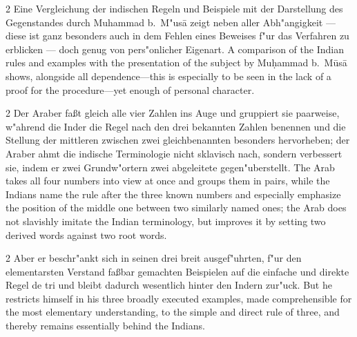\documentclass[10pt,a4paper]{article}
\renewcommand{\switchcolumn}{\syncronize\nointerlineskip\columnbreak}
\begin{document}
\begin{paracol}{2}
Eine Vergleichung der indischen Regeln und Beispiele mit der Darstellung des Gegenstandes durch Muhammad b.\ M"us\=a zeigt neben aller Abh"angigkeit --- diese ist ganz besonders auch in dem Fehlen eines Beweises f"ur das Verfahren zu erblicken --- doch genug von pers"onlicher Eigenart.
\switchcolumn
A comparison of the Indian rules and examples with the presentation of the subject by Mu\d{h}ammad b.\ M\=us\=a shows, alongside all dependence---this is especially to be seen in the lack of a proof for the procedure---yet enough of personal character.
\end{paracol}

\begin{paracol}{2}
Der Araber fa\ss{}t gleich alle vier Zahlen ins Auge und gruppiert sie paarweise, w"ahrend die Inder die Regel nach den drei bekannten Zahlen benennen und die Stellung der mittleren zwischen zwei gleichbenannten besonders hervorheben; der Araber ahmt die indische Terminologie nicht sklavisch nach, sondern verbessert sie, indem er zwei Grundw"ortern zwei abgeleitete gegen"uberstellt.
\switchcolumn
The Arab takes all four numbers into view at once and groups them in pairs, while the Indians name the rule after the three known numbers and especially emphasize the position of the middle one between two similarly named ones; the Arab does not slavishly imitate the Indian terminology, but improves it by setting two derived words against two root words.
\end{paracol}

\begin{paracol}{2}
Aber er beschr"ankt sich in seinen drei breit ausgef"uhrten, f"ur den elementarsten Verstand fa\ss{}bar gemachten Beispielen auf die einfache und direkte Regel de tri und bleibt dadurch wesentlich hinter den Indern zur"uck.
\switchcolumn
But he restricts himself in his three broadly executed examples, made comprehensible for the most elementary understanding, to the simple and direct rule of three, and thereby remains essentially behind the Indians.
\end{paracol}
\end{document}
